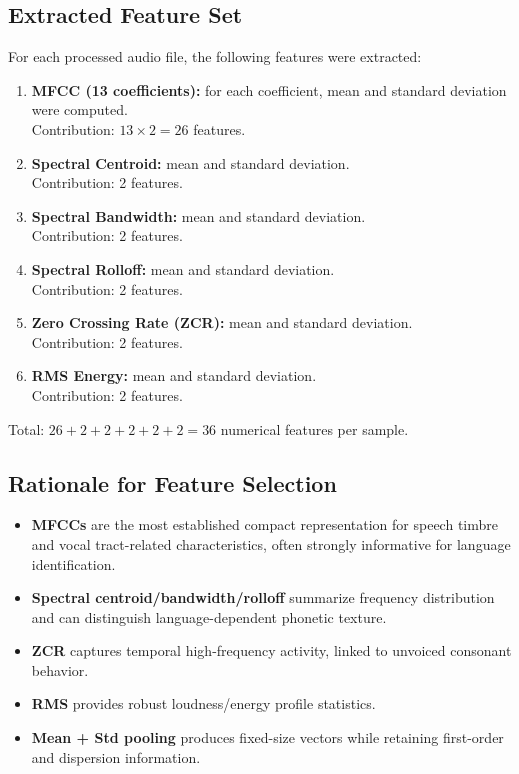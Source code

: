 \documentclass[a4paper,14pt]{extarticle}
\begin{document}
\subsection{Extracted Feature Set}
For each processed audio file, the following features were extracted:
\begin{enumerate}
    \item \textbf{MFCC (13 coefficients):} for each coefficient, mean and standard deviation were computed.\\
    Contribution: \(13 \times 2 = 26\) features.
    \item \textbf{Spectral Centroid:} mean and standard deviation.\\
    Contribution: 2 features.
    \item \textbf{Spectral Bandwidth:} mean and standard deviation.\\
    Contribution: 2 features.
    \item \textbf{Spectral Rolloff:} mean and standard deviation.\\
    Contribution: 2 features.
    \item \textbf{Zero Crossing Rate (ZCR):} mean and standard deviation.\\
    Contribution: 2 features.
    \item \textbf{RMS Energy:} mean and standard deviation.\\
    Contribution: 2 features.
\end{enumerate}

Total: \(26 + 2 + 2 + 2 + 2 + 2 = 36\) numerical features per sample.

\subsection{Rationale for Feature Selection}
\begin{itemize}
    \item \textbf{MFCCs} are the most established compact representation for speech timbre and vocal tract-related characteristics, often strongly informative for language identification.
    \item \textbf{Spectral centroid/bandwidth/rolloff} summarize frequency distribution and can distinguish language-dependent phonetic texture.
    \item \textbf{ZCR} captures temporal high-frequency activity, linked to unvoiced consonant behavior.
    \item \textbf{RMS} provides robust loudness/energy profile statistics.
    \item \textbf{Mean + Std pooling} produces fixed-size vectors while retaining first-order and dispersion information.
\end{itemize}
\end{document}
